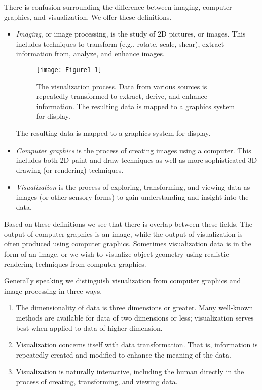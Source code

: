 There is confusion surrounding the difference between imaging, computer graphics, and visualization. We offer these definitions.

\begin{itemize}
  \item  \emph{Imaging}, or image processing, is the study of 2D pictures, or images. This includes techniques to transform (e.g., rotate, scale, shear), extract information from, analyze, and enhance images.
\begin{figure}[ht]
  \centering
  \texttt{[image: Figure1-1]}\\
  \caption{The visualization process. Data from various sources is repeatedly transformed to extract, derive, and enhance information. The resulting data is mapped to a graphics system for display.}\label{fig:Figure1-1}
\end{figure}

The resulting data is mapped to a graphics system for display.

  \item  \emph{Computer graphics} is the process of creating images using a computer. This includes both 2D paint-and-draw techniques as well as more sophisticated 3D drawing (or rendering) techniques.

  \item \emph{Visualization} is the process of exploring, transforming, and viewing data as images (or other sensory forms) to gain understanding and insight into the data.
\end{itemize}

Based on these definitions we see that there is overlap between these fields. The output of computer graphics is an image, while the output of visualization is often produced using computer graphics. Sometimes visualization data is in the form of an image, or we wish to visualize object geometry using realistic rendering techniques from computer graphics.

Generally speaking we distinguish visualization from computer graphics and image processing in three ways.

\begin{enumerate}
  \item The dimensionality of data is three dimensions or greater. Many well-known methods are available for data of two dimensions or less; visualization serves best when applied to data of higher dimension.

  \item Visualization concerns itself with data transformation. That is, information is repeatedly created and modified to enhance the meaning of the data.

  \item Visualization is naturally interactive, including the human directly in the process of creating, transforming, and viewing data.
\end{enumerate}

